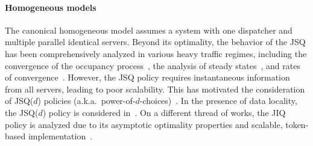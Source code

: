 \documentclass[11pt, reqno]{article}
\numberwithin{equation}{section}
\numberwithin{theorem}{section}
\begin{document}
\paragraph{Homogeneous models} The canonical homogeneous model assumes a system with one dispatcher and multiple parallel identical servers. Beyond its optimality, the behavior of the JSQ has been comprehensively analyzed in various heavy traffic regimes, including the convergence of the occupancy process~\citep{EG18,GW19,zhao21}, the analysis of steady states~\citep{BM19a,BM19b,Braverman18,HM20,HLM22,LY19,LY21}, and rates of convergence~\citep{Braverman22}. 
However, the JSQ policy requires instantaneous information from all servers, leading to poor scalability. This has motivated the consideration of JSQ($d$) policies (a.k.a.~power-of-$d$-choices)~\cite{Mitzenmacher96,VDK96}.
In the presence of data locality, the JSQ($d$) policy is considered in~\cite{RM22,RM23}.
On a different thread of works, the JIQ policy is analyzed due to its asymptotic optimality properties and scalable, token-based implementation~\cite{AS15,LXKGLG11, MBLW16-1}.
\end{document}
